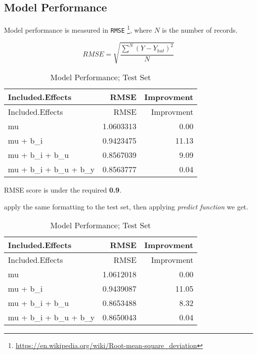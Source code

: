 \documentclass[]{article}
\newenvironment{Shaded}{\begin{snugshade}}{\end{snugshade}}
\newcommand{\KeywordTok}[1]{\textcolor[rgb]{0.13,0.29,0.53}{\textbf{#1}}}
\newcommand{\StringTok}[1]{\textcolor[rgb]{0.31,0.60,0.02}{#1}}
\newcommand{\OperatorTok}[1]{\textcolor[rgb]{0.81,0.36,0.00}{\textbf{#1}}}
\newcommand{\NormalTok}[1]{#1}
\let\rmarkdownfootnote\footnote%
\def\footnote{\protect\rmarkdownfootnote}
\begin{document}
\subsection{Model Performance}\label{model-performance}

Model performance is measured in \texttt{RMSE} \footnote{\url{https://en.wikipedia.org/wiki/Root-mean-square_deviation}},
where \(N\) is the number of records.

\[
RMSE = \sqrt {\frac{\sum_{}^{N} (Y - Y_{hat})^2}{N}}
\]

\begin{Shaded}
\end{Shaded}

\begin{longtable}[]{@{}lrr@{}}
\caption{Model Performance; Test Set}\tabularnewline
\toprule
Included.Effects & RMSE & Improvment\tabularnewline
\midrule
\endfirsthead
\toprule
Included.Effects & RMSE & Improvment\tabularnewline
\midrule
\endhead
mu & 1.0603313 & 0.00\tabularnewline
mu + b\_i & 0.9423475 & 11.13\tabularnewline
mu + b\_i + b\_u & 0.8567039 & 9.09\tabularnewline
mu + b\_i + b\_u + b\_y & 0.8563777 & 0.04\tabularnewline
\bottomrule
\end{longtable}

RMSE score is under the required \textbf{0.9}.

apply the same formatting to the test set, then applying \emph{predict
function} we get.

\begin{Shaded}
\end{Shaded}

\begin{longtable}[]{@{}lrr@{}}
\caption{Model Performance; Test Set}\tabularnewline
\toprule
Included.Effects & RMSE & Improvment\tabularnewline
\midrule
\endfirsthead
\toprule
Included.Effects & RMSE & Improvment\tabularnewline
\midrule
\endhead
mu & 1.0612018 & 0.00\tabularnewline
mu + b\_i & 0.9439087 & 11.05\tabularnewline
mu + b\_i + b\_u & 0.8653488 & 8.32\tabularnewline
mu + b\_i + b\_u + b\_y & 0.8650043 & 0.04\tabularnewline
\bottomrule
\end{longtable}
\end{document}
